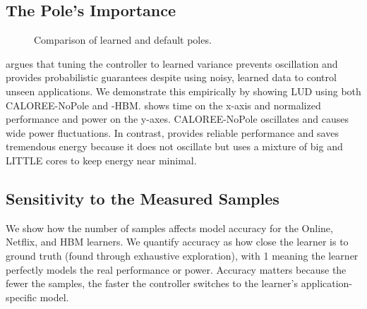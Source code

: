 \subsection{The Pole's Importance}


\begin{figure} 

\caption{Comparison of learned and default poles.}
\label{fig:lavamd-pole}
\end{figure} argues that tuning the
controller to learned variance prevents oscillation and provides
probabilistic guarantees despite using noisy, learned data to control
unseen applications.  We demonstrate this empirically by showing LUD
using both CALOREE-NoPole and \SYSTEM{}-HBM.  
shows time on the x-axis and normalized performance and power on the
y-axes.  CALOREE-NoPole oscillates and causes wide power fluctuations.
In contrast, \SYSTEM{} provides reliable performance and saves
tremendous energy because it does not oscillate but uses a mixture of
big and LITTLE cores to keep energy near minimal.

\subsection{Sensitivity to the Measured Samples}
We show how the number of samples affects model accuracy for the
Online, Netflix, and HBM learners.  We quantify accuracy as how close
the learner is to ground truth (found through exhaustive exploration),
with 1 meaning the learner perfectly models the real performance or
power.  Accuracy matters because the fewer the samples, the faster the
controller switches to the learner's application-specific model.

